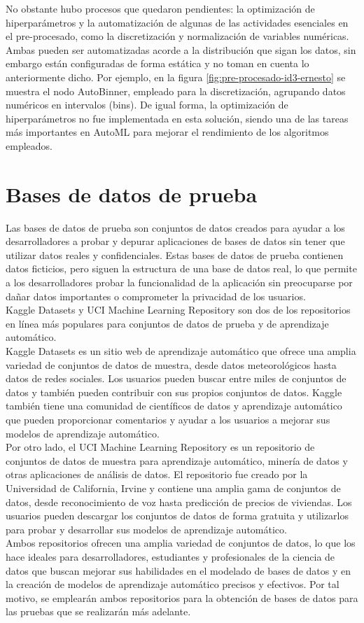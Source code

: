 No obstante hubo procesos que quedaron pendientes: la optimización de hiperparámetros y la automatización de algunas de las actividades esenciales en el pre-procesado, como la discretización y normalización de variables numéricas. Ambas pueden ser automatizadas acorde a la distribución que sigan los datos, sin embargo están configuradas de forma estática y no toman en cuenta lo anteriormente dicho. Por ejemplo, en la figura \ref{fig:pre-procesado-id3-ernesto} se muestra el nodo AutoBinner, empleado para la discretización, agrupando datos numéricos en intervalos (bins). De igual forma, la optimización de hiperparámetros no fue implementada en esta solución, siendo una de las tareas más importantes en AutoML para mejorar el rendimiento de los algoritmos empleados.

\section{Bases de datos de prueba}
Las bases de datos de prueba son conjuntos de datos creados para ayudar a los desarrolladores a probar y depurar aplicaciones de bases de datos sin tener que utilizar datos reales y confidenciales. Estas bases de datos de prueba contienen datos ficticios, pero siguen la estructura de una base de datos real, lo que permite a los desarrolladores probar la funcionalidad de la aplicación sin preocuparse por dañar datos importantes o comprometer la privacidad de los usuarios. \\
Kaggle Datasets y UCI Machine Learning Repository son dos de los repositorios en línea más populares para conjuntos de datos de prueba y de aprendizaje automático. \\
Kaggle Datasets es un sitio web de aprendizaje automático que ofrece una amplia variedad de conjuntos de datos de muestra, desde datos meteorológicos hasta datos de redes sociales. Los usuarios pueden buscar entre miles de conjuntos de datos y también pueden contribuir con sus propios conjuntos de datos. Kaggle también tiene una comunidad de científicos de datos y aprendizaje automático que pueden proporcionar comentarios y ayudar a los usuarios a mejorar sus modelos de aprendizaje automático. \\
Por otro lado, el UCI Machine Learning Repository es un repositorio de conjuntos de datos de muestra para aprendizaje automático, minería de datos y otras aplicaciones de análisis de datos. El repositorio fue creado por la Universidad de California, Irvine y contiene una amplia gama de conjuntos de datos, desde reconocimiento de voz hasta predicción de precios de viviendas. Los usuarios pueden descargar los conjuntos de datos de forma gratuita y utilizarlos para probar y desarrollar sus modelos de aprendizaje automático. \\
Ambos repositorios ofrecen una amplia variedad de conjuntos de datos, lo que los hace ideales para desarrolladores, estudiantes y profesionales de la ciencia de datos que buscan mejorar sus habilidades en el modelado de bases de datos y en la creación de modelos de aprendizaje automático precisos y efectivos. Por tal motivo, se emplearán ambos repositorios para la obtención de bases de datos para las pruebas que se realizarán más adelante.


